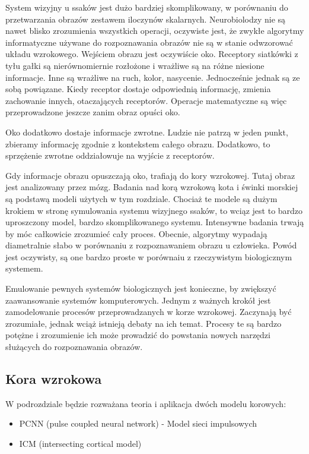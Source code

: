
System wizyjny u ssaków jest dużo bardziej skomplikowany, w porównaniu do przetwarzania obrazów zestawem iloczynów skalarnych.
Neurobiolodzy nie są nawet blisko zrozumienia wszystkich operacji,
oczywiste jest, że zwykłe algorytmy informatyczne używane do rozpoznawania obrazów nie są w stanie odwzorować układu wzrokowego.
Wejściem obrazu jest oczywiście oko. 
Receptory siatkówki z tyłu gałki są nierównomiernie rozłożone i wrażliwe są na różne niesione informacje.
Inne są wrażliwe na ruch, kolor, nasycenie. Jednocześnie jednak są ze sobą powiązane.
Kiedy receptor dostaje odpowiednią informację, zmienia zachowanie innych, otaczających receptorów.
Operacje matematyczne są więc przeprowadzone jeszcze zanim obraz opuści oko.


Oko dodatkowo dostaje informacje zwrotne. 
Ludzie nie patrzą w jeden punkt, zbieramy informację zgodnie z kontekstem całego obrazu.
Dodatkowo, to sprzężenie zwrotne oddziałowuje na wyjście z receptorów.

Gdy informacje obrazu opuszczają oko, trafiają do kory wzrokowej.
Tutaj obraz jest analizowany przez mózg.
Badania nad korą wzrokową kota i świnki morskiej są podstawą modeli użytych w tym rozdziale.
Chociaż te modele są dużym krokiem w stronę symulowania systemu wizyjnego ssaków,
to wciąz jest to bardzo uproszczony model, bardzo skomplikowanego systemu.
Intensywne badania trwają by móc całkowicie zrozumieć cały proces.
Obecnie, algorytmy wypadają diametralnie słabo w porównaniu z rozpoznawaniem obrazu u człowieka.
Powód jest oczywisty, są one bardzo proste w porównaiu z rzeczywistym biologicznym systemem.

Emulowanie pewnych systemów biologicznych jest konieczne, by zwiększyć zaawansowanie systemów komputerowych.
Jednym z ważnych krokół jest zamodelowanie procesów przeprowadzanych w korze wzrokowej.
Zaczynają być zrozumiałe, jednak wciąż istnieją debaty na ich temat.
Procesy te są bardzo potężne i zrozumienie ich może prowadzić do powstania nowych narzędzi służących do rozpoznawania obrazów.

\subsection{Kora wzrokowa}
W podrozdziale będzie rozważana teoria i aplikacja dwóch modelu korowych:
\begin{itemize}
	\item PCNN (pulse coupled neural network) - Model sieci impulsowych
	\item ICM (intersecting cortical model)
\end{itemize}

